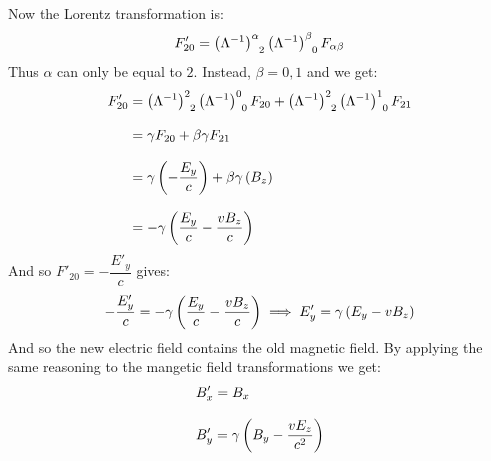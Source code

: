 Now the Lorentz transformation is:
\begin{equation}
  F'_{20} = \tensor{\brackets{\lm^{-1}}}{^{\alpha}_{2}}\tensor{\brackets{\lm^{-1}}}{^{\beta}_{0}}F_{\alpha\beta}
\end{equation}
Thus $\alpha$ can only be equal to $2$. Instead, $\beta = 0,1$ and we get:
\begin{equation}
  \begin{split}
    F'_{20} &= \tensor{\brackets{\lm^{-1}}}{^{2}_{2}}\tensor{\brackets{\lm^{-1}}}{^{0}_{0}}F_{20} + \tensor{\brackets{\lm^{-1}}}{^{2}_{2}}\tensor{\brackets{\lm^{-1}}}{^{1}_{0}}F_{21} \\[8pt]
    &= \gamma F_{20} + \beta\gamma F_{21} \\[8pt]
    &= \gamma \left(-\dfrac{E_y}{c}\right) + \beta\gamma \left(B_z\right) \\[8pt]
    &= -\gamma \brackets{\dfrac{E_y}{c} - \dfrac{v B_z}{c}}
  \end{split}
\end{equation}
And so $F'_{20} = -\dfrac{E'_y}{c}$ gives:
\begin{equation}
  -\dfrac{E'_y}{c} = -\gamma \left(\dfrac{E_y}{c} - \dfrac{v B_z}{c}\right) \implies E'_y = \gamma \left(E_y - vB_z\right)
\end{equation}
And so the new electric field contains the old magnetic field. By applying the same reasoning to the mangetic field transformations we get:
\begin{equation}
  \begin{split}
    &B'_x = B_x \\[8pt]
    &B'_y = \gamma \left(B_y - \dfrac{v E_z}{c^2}\right)
  \end{split}
\end{equation}
